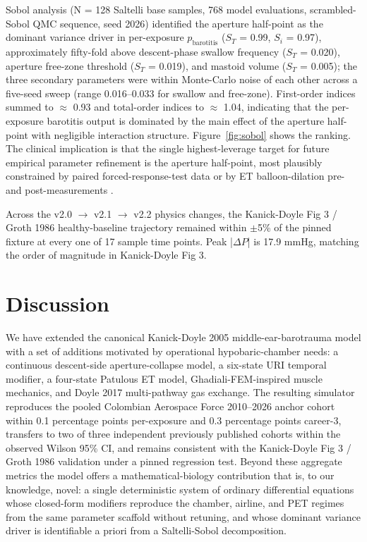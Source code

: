 \documentclass[11pt,a4paper]{article}
\begin{document}
Sobol analysis (N = 128 Saltelli base samples, 768 model evaluations, scrambled-Sobol QMC sequence, seed 2026) identified the aperture half-point as the dominant variance driver in per-exposure $p_{\mathrm{barotitis}}$ ($S_T$ = 0.99, $S_i$ = 0.97), approximately fifty-fold above descent-phase swallow frequency ($S_T$ = 0.020), aperture free-zone threshold ($S_T$ = 0.019), and mastoid volume ($S_T$ = 0.005); the three secondary parameters were within Monte-Carlo noise of each other across a five-seed sweep (range 0.016--0.033 for swallow and free-zone). First-order indices summed to $\approx$ 0.93 and total-order indices to $\approx$ 1.04, indicating that the per-exposure barotitis output is dominated by the main effect of the aperture half-point with negligible interaction structure. Figure~\ref{fig:sobol} shows the ranking. The clinical implication is that the single highest-leverage target for future empirical parameter refinement is the aperture half-point, most plausibly constrained by paired forced-response-test data or by ET balloon-dilation pre- and post-measurements \citep{Alper2020}.

Across the v2.0 $\rightarrow$ v2.1 $\rightarrow$ v2.2 physics changes, the Kanick-Doyle Fig 3 / Groth 1986 healthy-baseline trajectory remained within $\pm$5\% of the pinned fixture at every one of 17 sample time points. Peak |$\Delta P$| is 17.9 mmHg, matching the order of magnitude in Kanick-Doyle Fig 3.



\section{Discussion}

We have extended the canonical Kanick-Doyle 2005 middle-ear-barotrauma model with a set of additions motivated by operational hypobaric-chamber needs: a continuous descent-side aperture-collapse model, a six-state URI temporal modifier, a four-state Patulous ET model, Ghadiali-FEM-inspired muscle mechanics, and Doyle 2017 multi-pathway gas exchange. The resulting simulator reproduces the pooled Colombian Aerospace Force 2010--2026 anchor cohort within 0.1 percentage points per-exposure and 0.3 percentage points career-3, transfers to two of three independent previously published cohorts within the observed Wilson 95\% CI, and remains consistent with the Kanick-Doyle Fig 3 / Groth 1986 validation under a pinned regression test. Beyond these aggregate metrics the model offers a mathematical-biology contribution that is, to our knowledge, novel: a single deterministic system of ordinary differential equations whose closed-form modifiers reproduce the chamber, airline, and PET regimes from the same parameter scaffold without retuning, and whose dominant variance driver is identifiable a priori from a Saltelli-Sobol decomposition.
\end{document}
